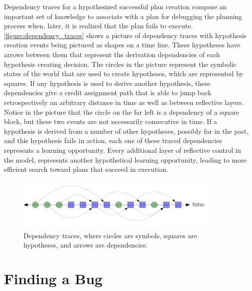 Dependency traces for a hypothesized successful plan creation compose
an important set of knowledge to associate with a plan for debugging
the planning process when, later, it is realized that the plan fails
to execute.  {\mbox{\autoref{figure:dependency_traces}}} shows a
picture of dependency traces with hypothesis creation events being
pictured as shapes on a time line.  These hypotheses have arrows
between them that represent the derivation dependencies of each
hypothesis creating decision.  The circles in the picture represent
the symbolic states of the world that are used to create hypotheses,
which are represented by squares.  If any hypothesis is used to derive
another hypothesis, these dependencies give a credit assignment path
that is able to jump back retrospectively an arbitrary distance in
time as well as between reflective layers.  Notice in the picture that
the circle on the far left is a dependency of a square block, but
these two events are not necessarily consecutive in time.  If a
hypothesis is derived from a number of other hypotheses, possibly far
in the past, and this hypothesis fails in action, each one of these
traced dependencies represents a learning opportunity.  Every
additional layer of reflective control in the model, represents
another hypothetical learning opportunity, leading to more efficient
search toward plans that succeed in execution.
\begin{figure}
\center
\includegraphics[width=10cm]{gfx/dependency_traces}
\caption[Dependency traces.]{Dependency traces, where circles are
  symbols, squares are hypotheses, and arrows are dependencies.}
\label{figure:dependency_traces}
\end{figure}

\section{Finding a Bug}

